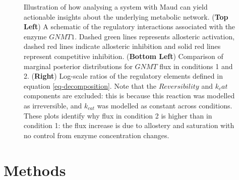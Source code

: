 \documentclass[journal=asbcd6,manuscript=article,layout=traditional]{achemso}
\begin{document}
\begin{figure}

\begin{minipage}[t]{\linewidth}

{\centering 


}

\end{minipage}%

\caption{\label{fig-decomposition}Illustration of how analysing a system
with Maud can yield actionable insights about the underlying metabolic
network. (\textbf{Top Left}) A schematic of the regulatory interactions
associated with the enzyme \(GNMT1\). Dashed green lines represents
allosteric activation, dashed red lines indicate allosteric inhibition
and solid red lines represent competitive inhibition. (\textbf{Bottom
Left}) Comparison of marginal posterior distributions for \(GNMT\) flux
in conditions 1 and 2. (\textbf{Right}) Log-scale ratios of the
regulatory elements defined in equation \eqref{eq-decomposition}. Note
that the \(Reversibility\) and \(k_cat\) components are excluded: this
is because this reaction was modelled as irreversible, and \(k_{cat}\)
was modelled as constant across conditions. These plots identify why
flux in condition 2 is higher than in condition 1: the flux increase is
due to allostery and saturation with no control from enzyme
concentration changes.}

\end{figure}

\hypertarget{methods}{%
\section{Methods}\label{methods}}
\end{document}
